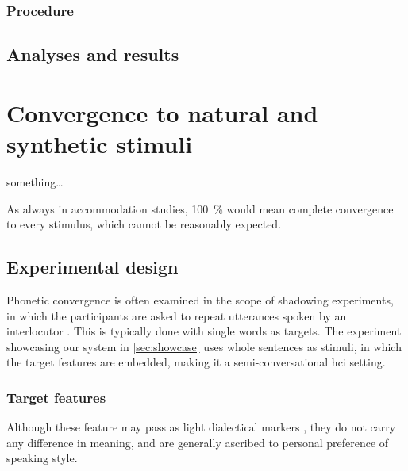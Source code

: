 \subsubsection{Procedure}
\label{subsubsec:procedure_music}

\subsection{Analyses and results}
\label{subsec:results_music}

\section{Convergence to natural and synthetic stimuli}
\label{sec:convergence_to_natural_and_synthetic_stimuli}

something\ldots

As always in accommodation studies, \SI{100}{\percent} would mean complete convergence to every stimulus, which cannot be reasonably expected.

\subsection{Experimental design}
\label{subsec:design_HCIConv}

Phonetic convergence is often examined in the scope of shadowing experiments, in which the participants are asked to repeat utterances spoken by an interlocutor \citep[e.g.,][]{Pardo2017phonetic, Dias2016visibilivty, Walker2015repeat, Shockley2004imitation}.
This is typically done with single words as targets.
The experiment showcasing our system in \cref{sec:showcase} uses whole sentences as stimuli, in which the target features are embedded, making it a semi-conversational \ac{hci} setting.

\subsubsection{Target features}
\label{subsec:target_features_HCIConv}


Although these feature may pass as light dialectical markers \citep{Mitterer2013regional}, they do not carry any difference in meaning, and are generally ascribed to personal preference of speaking style.

